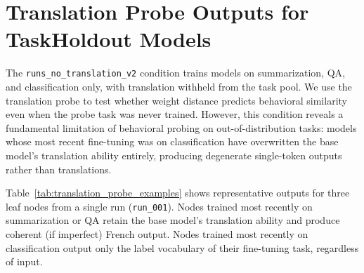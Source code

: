 \documentclass{article}
\theoremstyle{definition}
\theoremstyle{plain}
\begin{document}
\section{Translation Probe Outputs for TaskHoldout Models}
\label{app:translation_probe}

The \texttt{runs\_no\_translation\_v2} condition trains models on summarization,
QA, and classification only, with translation withheld from the task pool. We use
the translation probe to test whether weight distance predicts behavioral similarity
even when the probe task was never trained. However, this condition reveals a
fundamental limitation of behavioral probing on out-of-distribution tasks: models
whose most recent fine-tuning was on classification have overwritten the base
model's translation ability entirely, producing degenerate single-token outputs
rather than translations.

Table~\ref{tab:translation_probe_examples} shows representative outputs for three
leaf nodes from a single run (\texttt{run\_001}). Nodes trained most recently on
summarization or QA retain the base model's translation ability and produce
coherent (if imperfect) French output. Nodes trained most recently on
classification output only the label vocabulary of their fine-tuning task,
regardless of input.
\end{document}
